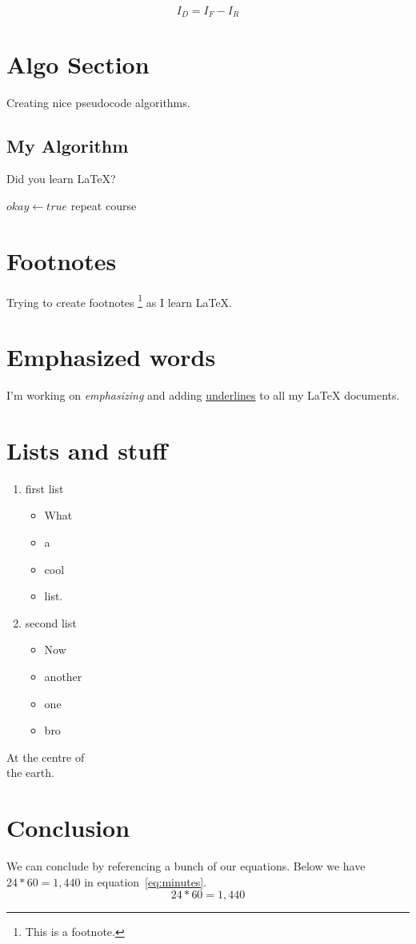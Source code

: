 \documentclass{article}
\begin{document}
\begin{equation}
I_D = I_F - I_R
\end{equation}

\section{Algo Section}

Creating nice pseudocode algorithms.

\subsection{My Algorithm}

Did you learn \LaTeX?

\begin{algorithmic}
	\State $okay \gets true$
\Else
		\State repeat course
	\EndWhile
\EndIf
\end{algorithmic}

\section{Footnotes}
Trying to create footnotes \footnote{This is a footnote.} as I learn \LaTeX.

\section{Emphasized words}
I'm working on \emph{emphasizing} and adding \underline{underlines} to all my \LaTeX{} documents.

\section{Lists and stuff}
\begin{enumerate}
\item first list
\begin{itemize}
\item What 
\item a 
\item cool
\item list.  
\end{itemize}
\item second list
\begin{itemize}
\item Now 
\item another
\item one
\item bro 
\end{itemize}
\end{enumerate}

\begin{center}
At the centre of \\ the earth.
\end{center}


\section{Conclusion}
We can conclude by referencing a bunch of our equations. Below we have $24 * 60 = 1,440$ in equation~\ref{eq:minutes}.
\begin{equation}
24 * 60 = 1,440 
\label{eq:minutes}
\end{equation}
\end{document}

